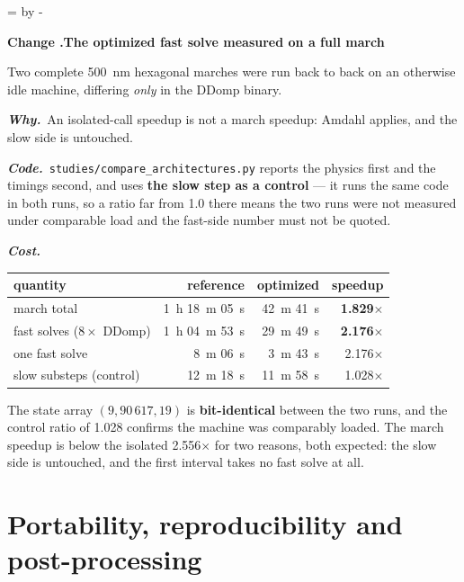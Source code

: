 \documentclass[11pt,a4paper]{article}
\newcommand{\code}[1]{\texttt{\small #1}}
\newcommand{\needlines}[1]{%
  \par\dimen0=\pagegoal \advance\dimen0 by -\pagetotal
  \ifdim\dimen0<#1\baselineskip \newpage \fi}
\newcounter{chg}
\newcommand{\change}[1]{%
  \needlines{4}%
  \refstepcounter{chg}%
  \par\medskip\noindent
  {\bfseries\boldmath Change \thechg.\quad #1}%
  \par\nobreak\smallskip}
\newcommand{\why}[1]{\par\noindent\textbf{\itshape Why.}\ #1\par}
\newcommand{\impact}[1]{\par\noindent\textbf{\itshape Code.}\ #1\par}
\newcommand{\cost}[1]{\par\noindent\textbf{\itshape Cost.}\ #1\par}
\begin{document}
\change{The optimized fast solve measured on a full march}
\label{chg:abcompare}
Two complete 500~nm hexagonal marches were run back to back on an otherwise
idle machine, differing \emph{only} in the DDomp binary.
\why{An isolated-call speedup is not a march speedup: Amdahl applies, and the
slow side is untouched.}
\impact{\code{studies/compare\_architectures.py} reports the physics first and
the timings second, and uses \textbf{the slow step as a control} --- it runs the
same code in both runs, so a ratio far from 1.0 there means the two runs were
not measured under comparable load and the fast-side number must not be
quoted.}
\cost{
\begin{center}
\begin{tabular}{lrrr}
\toprule
quantity & reference & optimized & speedup \\
\midrule
march total & 1~h 18~m 05~s & 42~m 41~s & \textbf{1.829}$\times$ \\
fast solves ($8\times$ DDomp) & 1~h 04~m 53~s & 29~m 49~s & \textbf{2.176}$\times$ \\
one fast solve & 8~m 06~s & 3~m 43~s & 2.176$\times$ \\
slow substeps (control) & 12~m 18~s & 11~m 58~s & 1.028$\times$ \\
\bottomrule
\end{tabular}
\end{center}

\noindent
The state array $(9, 90\,617, 19)$ is \textbf{bit-identical} between the two
runs, and the control ratio of 1.028 confirms the machine was comparably
loaded. The march speedup is below the isolated 2.556$\times$ for two reasons,
both expected: the slow side is untouched, and the first interval takes no fast
solve at all.}

\part{Portability, reproducibility and post-processing}
\label{part:support}
\end{document}
